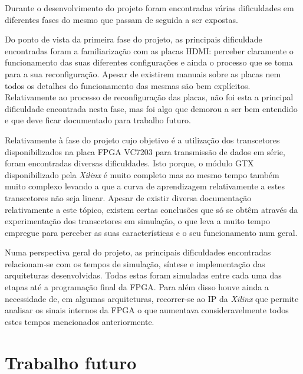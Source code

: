 Durante o desenvolvimento do projeto foram encontradas várias dificuldades em diferentes fases do mesmo que passam de seguida a ser expostas.

Do ponto de vista da primeira fase do projeto, as principais dificuldade encontradas foram a familiarização com as placas HDMI: perceber claramente o funcionamento das suas diferentes configurações e ainda o processo que se toma para a sua reconfiguração. Apesar de existirem manuais sobre as placas nem todos os detalhes do funcionamento das mesmas são bem explícitos. Relativamente ao processo de reconfiguração das placas, não foi esta a principal dificuldade encontrada nesta fase, mas foi algo que demorou a ser bem entendido e que deve ficar documentado para trabalho futuro. 


Relativamente à fase do projeto cujo objetivo é a utilização dos transcetores disponibilizados na placa FPGA VC7203 para transmissão de dados em série, foram encontradas diversas dificuldades. Isto porque, o módulo GTX disponibilizado pela \textit{Xilinx} é muito completo mas ao mesmo tempo também muito complexo levando a que a curva de aprendizagem relativamente a estes transcetores não seja linear. Apesar de existir diversa documentação relativamente a este tópico, existem certas conclusões que só se obtêm através da experimentação dos transcetores em simulação, o que leva a muito tempo empregue para perceber as suas características e o seu funcionamento num geral.



Numa perspectiva geral do projeto, as principais dificuldades encontradas relacionam-se com os tempos de simulação, síntese e implementação das arquiteturas desenvolvidas. Todas estas foram simuladas entre cada uma das etapas até a programação final da FPGA. Para além disso houve ainda a necessidade de, em algumas arquiteturas, recorrer-se ao IP da \textit{Xilinx} que permite analisar os sinais internos da FPGA o que aumentava consideravelmente todos estes tempos mencionados anteriormente.



\section{Trabalho futuro}

